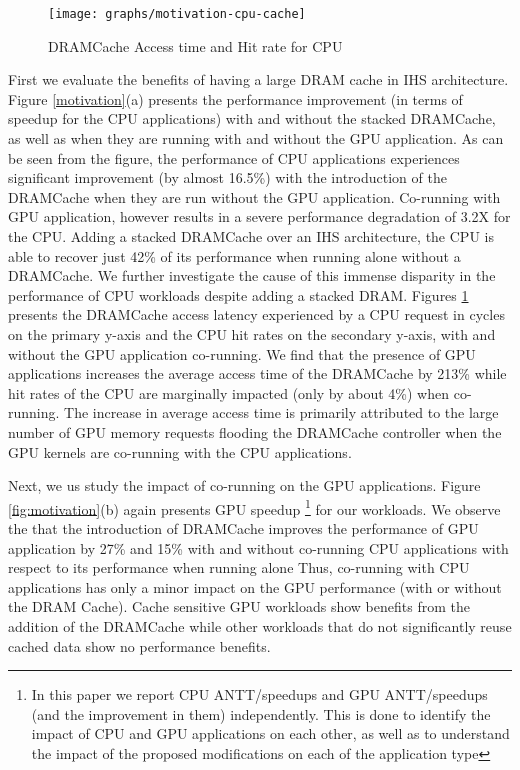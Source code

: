 \begin{figure}[htbp]
   \texttt{[image: graphs/motivation-cpu-cache]}
   \caption{DRAMCache Access time and Hit rate for CPU}
   \label{fig:motivation-cpu-cache}
\end{figure}
First we evaluate the benefits of having a large DRAM cache in IHS architecture. Figure \ref{motivation}(a) presents the performance
improvement (in terms of speedup for the CPU applications) with and without
the stacked DRAMCache, as well as when they are running with and without the GPU application. As can be seen from the figure,
the performance of CPU applications experiences significant improvement (by almost 16.5\%) with the introduction 
of the DRAMCache when they are run without the GPU application. Co-running with GPU application, however results in a severe performance degradation of 3.2X for the CPU. 
Adding a stacked DRAMCache over an IHS architecture, the CPU is able to recover just 42\% of its performance when running alone without a DRAMCache. 
We further investigate the cause of this immense disparity in the performance of CPU workloads despite adding a stacked DRAM. Figures \ref{fig:motivation-cpu-cache} presents the DRAMCache access latency experienced by a CPU request in cycles on the primary y-axis and the CPU hit rates on the secondary y-axis, with and without the GPU application co-running. We find that the presence of GPU applications increases the average access time of the DRAMCache by 213\% while hit rates of the CPU are marginally impacted (only by about 4\%) when co-running.
The increase in average access time is primarily attributed to the large
number of GPU memory requests flooding the DRAMCache controller when the GPU kernels are co-running with the CPU applications.

Next, we us study the impact of co-running on the GPU applications.  Figure \ref{fig:motivation}(b) again presents GPU speedup \footnote{In this 
paper we report CPU ANTT/speedups and GPU ANTT/speedups (and the improvement in them) independently. This is done to identify the impact of CPU 
and GPU applications on each other, as well as to understand the impact of the proposed modifications on each of the application
type} 
for our workloads. 
We observe the that the introduction of DRAMCache improves the performance of GPU application by 27\% and 15\% with and without co-running CPU applications with respect to its performance when running alone
Thus,  co-running with CPU applications has only a minor impact on the GPU performance (with or without the DRAM Cache). 
Cache sensitive GPU workloads show benefits from the addition of the DRAMCache while other workloads that do not significantly reuse cached data show no performance benefits.

